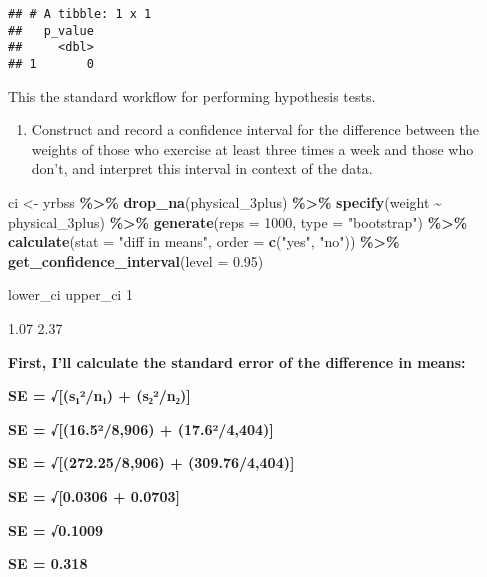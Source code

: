 \documentclass[
]{article}
\newenvironment{Shaded}{\begin{snugshade}}{\end{snugshade}}
\newcommand{\AttributeTok}[1]{\textcolor[rgb]{0.13,0.29,0.53}{#1}}
\newcommand{\DecValTok}[1]{\textcolor[rgb]{0.00,0.00,0.81}{#1}}
\newcommand{\FloatTok}[1]{\textcolor[rgb]{0.00,0.00,0.81}{#1}}
\newcommand{\FunctionTok}[1]{\textcolor[rgb]{0.13,0.29,0.53}{\textbf{#1}}}
\newcommand{\NormalTok}[1]{#1}
\newcommand{\OtherTok}[1]{\textcolor[rgb]{0.56,0.35,0.01}{#1}}
\newcommand{\SpecialCharTok}[1]{\textcolor[rgb]{0.81,0.36,0.00}{\textbf{#1}}}
\newcommand{\StringTok}[1]{\textcolor[rgb]{0.31,0.60,0.02}{#1}}
\providecommand{\tightlist}{%
  \setlength{\itemsep}{0pt}\setlength{\parskip}{0pt}}
\begin{document}
\begin{verbatim}
## # A tibble: 1 x 1
##   p_value
##     <dbl>
## 1       0
\end{verbatim}

This the standard workflow for performing hypothesis tests.

\begin{enumerate}
\def\labelenumi{\arabic{enumi}.}
\setcounter{enumi}{6}
\tightlist
\item
  Construct and record a confidence interval for the difference between
  the weights of those who exercise at least three times a week and
  those who don't, and interpret this interval in context of the data.
\end{enumerate}

\begin{Shaded}
\begin{Highlighting}[]
\NormalTok{ci }\OtherTok{\textless{}{-}}\NormalTok{ yrbss }\SpecialCharTok{\%\textgreater{}\%}
  \FunctionTok{drop\_na}\NormalTok{(physical\_3plus) }\SpecialCharTok{\%\textgreater{}\%}
  \FunctionTok{specify}\NormalTok{(weight }\SpecialCharTok{\textasciitilde{}}\NormalTok{ physical\_3plus) }\SpecialCharTok{\%\textgreater{}\%}
  \FunctionTok{generate}\NormalTok{(}\AttributeTok{reps =} \DecValTok{1000}\NormalTok{, }\AttributeTok{type =} \StringTok{"bootstrap"}\NormalTok{) }\SpecialCharTok{\%\textgreater{}\%}
  \FunctionTok{calculate}\NormalTok{(}\AttributeTok{stat =} \StringTok{"diff in means"}\NormalTok{, }\AttributeTok{order =} \FunctionTok{c}\NormalTok{(}\StringTok{"yes"}\NormalTok{, }\StringTok{"no"}\NormalTok{)) }\SpecialCharTok{\%\textgreater{}\%}
  \FunctionTok{get\_confidence\_interval}\NormalTok{(}\AttributeTok{level =} \FloatTok{0.95}\NormalTok{)}
\end{Highlighting}
\end{Shaded}

lower\_ci upper\_ci 1

1.07 2.37

\textbf{First, I'll calculate the standard error of the difference in
means:}

\textbf{SE = √{[}(s₁²/n₁) + (s₂²/n₂){]}}

\textbf{SE = √{[}(16.5²/8,906) + (17.6²/4,404){]}}

\textbf{SE = √{[}(272.25/8,906) + (309.76/4,404){]}}

\textbf{SE = √{[}0.0306 + 0.0703{]}}

\textbf{SE = √0.1009}

\textbf{SE = 0.318}
\end{document}
